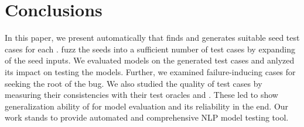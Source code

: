 \section{Conclusions}
\label{sec:concl}

In this paper, we present \tool automatically that finds and generates
suitable seed test cases for each \lc. \tool fuzz the seeds into a
sufficient number of test cases by expanding \cfg of the seed inputs.
We evaluated \sa models on the generated test cases and anlyzed its
impact on testing the models. Further, we examined failure-inducing
cases for seeking the root of the bug.  We also studied the quality of
\tool test cases by measuring their consistencies with their test
oracles and \lc. These led to show generalization ability of \tool for
model evaluation and its reliability in the end. Our work stands to
provide automated and comprehensive NLP model testing tool.
